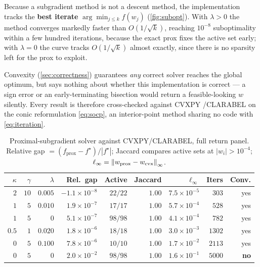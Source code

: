 Because a subgradient method is not a descent method, the implementation tracks the \textbf{best
iterate} $\arg\min_{j\le k} f(w_j)$ (\cref{fig:subopt}). With $\lambda>0$ the method converges
markedly faster than $O(1/\sqrt{k})$, reaching $10^{-8}$ suboptimality within a few hundred
iterations, because the exact prox fixes the active set early; with $\lambda=0$ the curve tracks
$O(1/\sqrt{k})$ almost exactly, since there is no sparsity left for the prox to exploit.

Convexity (\cref{sec:correctness}) guarantees \emph{any} correct solver reaches the global
optimum, but says nothing about whether this implementation is correct --- a sign error or an
early-terminating bisection would return a feasible-looking $w$ silently. Every result is
therefore cross-checked against CVXPY \citep{diamond2016}/CLARABEL \citep{clarabel2024} on the
conic reformulation \cref{eq:socp}, an interior-point method sharing no code with
\cref{eq:iteration}.

\begin{table}[htbp]
\centering
\caption{Proximal-subgradient solver against CVXPY/CLARABEL, full return panel. Relative gap
$=(f_{\text{prox}}-f^\star)/|f^\star|$; Jaccard compares active sets at $|w_i|>10^{-4}$;
$\ell_\infty = \left\lVert w_{\text{prox}} - w_{\text{cvx}} \right\rVert_\infty$.}
\label{tab:verification}
\small
\begin{tabular}{@{}rrrrrrrrr@{}}
\toprule
$\kappa$ & $\gamma$ & $\lambda$ & Rel.\ gap & Active & Jaccard & $\ell_\infty$ & Iters & Conv. \\
\midrule
$2$   & $10$ & $0.005$ & $-1.1\times10^{-8}$ & $22/22$ & $1.00$ & $7.5\times10^{-5}$ & $303$  & yes \\
$1$   & $5$  & $0.010$ & $1.9\times10^{-7}$  & $17/17$ & $1.00$ & $5.7\times10^{-4}$ & $528$  & yes \\
$1$   & $5$  & $0$     & $5.1\times10^{-7}$  & $98/98$ & $1.00$ & $4.1\times10^{-4}$ & $782$  & yes \\
$0.5$ & $1$  & $0.020$ & $1.8\times10^{-6}$  & $18/18$ & $1.00$ & $3.0\times10^{-3}$ & $1302$ & yes \\
$0$   & $5$  & $0.100$ & $7.8\times10^{-6}$  & $10/10$ & $1.00$ & $1.7\times10^{-2}$ & $2113$ & yes \\
$0$   & $5$  & $0$     & $2.0\times10^{-2}$  & $98/98$ & $1.00$ & $1.6\times10^{-1}$ & $5000$ & \textbf{no} \\
\bottomrule
\end{tabular}
\end{table}

